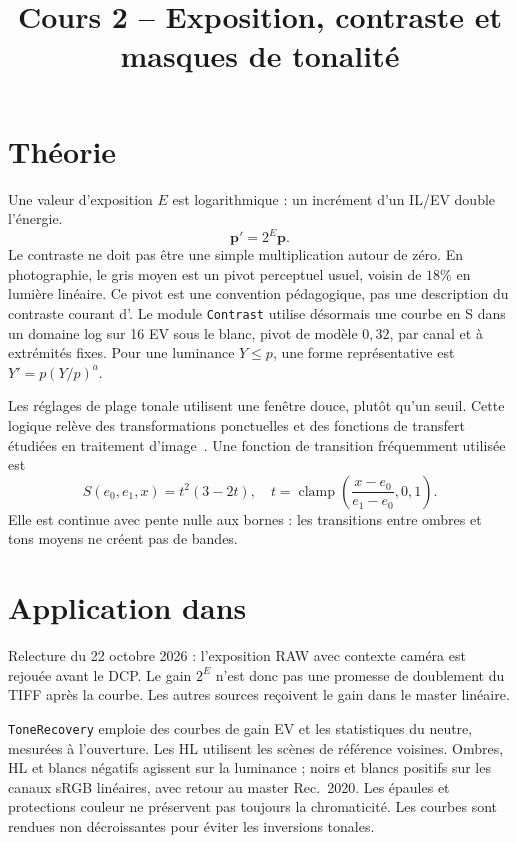 
\title{Cours 2 -- Exposition, contraste et masques de tonalité}


\section{Théorie}
Une valeur d'exposition $E$ est logarithmique : un incrément d'un IL/EV double l'énergie.
\begin{equation}
\mathbf{p}'=2^E\mathbf{p}.
\end{equation}
Le contraste ne doit pas être une simple multiplication autour de zéro. En photographie, le gris moyen est un pivot perceptuel usuel, voisin de $18\%$ en lumière linéaire. Ce pivot est une convention pédagogique, pas une description du contraste courant d'\IPR{}. Le module \texttt{Contrast} utilise désormais une courbe en S dans un domaine log sur 16 EV sous le blanc, pivot de modèle $0{,}32$, par canal et à extrémités fixes. Pour une luminance $Y\le p$, une forme représentative est $Y'=p(Y/p)^a$.

Les réglages de plage tonale utilisent une fenêtre douce, plutôt qu'un seuil. Cette logique relève des transformations ponctuelles et des fonctions de transfert étudiées en traitement d'image~\cite{gonzalezWoods}. Une fonction de transition fréquemment utilisée est
\begin{equation}
S(e_0,e_1,x)=t^2(3-2t),\quad t=\operatorname{clamp}\left(\frac{x-e_0}{e_1-e_0},0,1\right).
\end{equation}
Elle est continue avec pente nulle aux bornes : les transitions entre ombres et tons moyens ne créent pas de bandes.

\section{Application dans \IPR{}}
Relecture du 22 octobre 2026 : l'exposition RAW avec contexte caméra est rejouée avant le DCP. Le gain $2^E$ n'est donc pas une promesse de doublement du TIFF après la courbe. Les autres sources reçoivent le gain dans le master linéaire.

\texttt{ToneRecovery} emploie des courbes de gain EV et les statistiques du neutre, mesurées à l'ouverture. Les HL utilisent les scènes de référence voisines. Ombres, HL et blancs négatifs agissent sur la luminance ; noirs et blancs positifs sur les canaux sRGB linéaires, avec retour au master Rec.~2020. Les épaules et protections couleur ne préservent pas toujours la chromaticité. Les courbes sont rendues non décroissantes pour éviter les inversions tonales.

